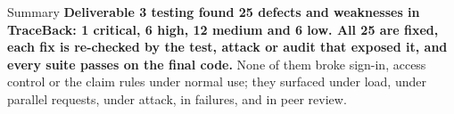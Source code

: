\documentclass[11pt,a4paper]{article}
\begin{document}
\begin{keybox}{Summary}
\textbf{Deliverable 3 testing found 25 defects and weaknesses in TraceBack: 1 critical, 6 high, 12 medium and 6 low. All 25 are fixed, each fix is re-checked by the test, attack or audit that exposed it, and every suite passes on the final code.} None of them broke sign-in, access control or the claim rules under normal use; they surfaced under load, under parallel requests, under attack, in failures, and in peer review.
\end{keybox}


\end{document}
